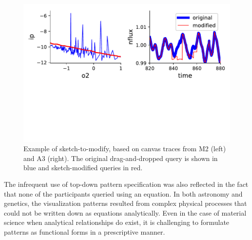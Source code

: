  \begin{figure}[h!]
     \centering
     \includegraphics[width=0.8\columnwidth]{figures/QueryModificationBySketch.pdf}
     \caption{Example of sketch-to-modify, based on canvas traces from M2 (left) and A3 (right). The original drag-and-dropped query is shown in blue and sketch-modified queries in red.}%
     \label{query_modification}
     \vspace{-10pt}
 \end{figure}
 \par The infrequent use of top-down pattern
 specification was also reflected in the fact
 that none of the participants queried using an equation.
 In both astronomy and genetics, the visualization patterns
 resulted from complex physical processes
 that could not be written down as equations analytically.
 Even in the case of material science when analytical
 relationships do exist, it is challenging to formulate patterns as functional forms in a prescriptive manner.
